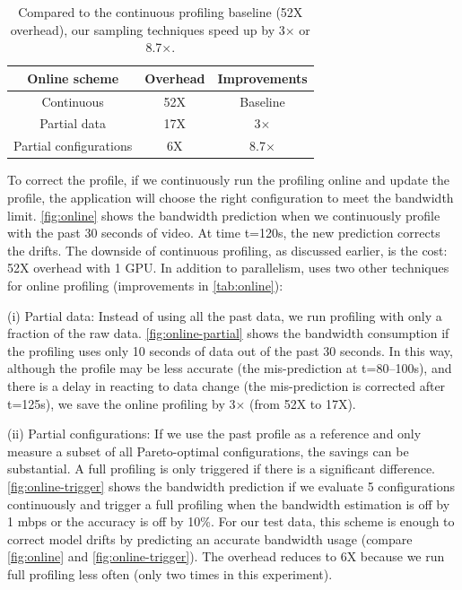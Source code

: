 
\begin{table}[t]
  \footnotesize
  \centering
  \begin{tabular}{c c c}
    \toprule
    Online scheme & Overhead & Improvements \\
    \midrule
    Continuous & 52X & Baseline \\
    Partial data & 17X & 3$\times$\\
    Partial configurations & 6X & 8.7$\times$ \\
    \bottomrule
  \end{tabular}
  \caption{Compared to the continuous profiling baseline (52X overhead), our
    sampling techniques speed up by 3$\times$ or 8.7$\times$.}
  \label{tab:online}
\end{table}

To correct the profile, if we continuously run the profiling online and update
the profile, the application will choose the right configuration to meet the
bandwidth limit.  \autoref{fig:online} shows the bandwidth prediction when we
continuously profile with the past 30 seconds of video. At time t=120s, the new
prediction corrects the drifts. The downside of continuous profiling, as
discussed earlier, is the cost: 52X overhead with 1 GPU\@. In addition to
parallelism, \sysname{} uses two other techniques for online profiling
(improvements in \autoref{tab:online}):

(i) Partial data: Instead of using all the past data, we run profiling with only
a fraction of the raw data.  \autoref{fig:online-partial} shows the bandwidth
consumption if the profiling uses only 10 seconds of data out of the past 30
seconds. In this way, although the profile may be less accurate (the
mis-prediction at t=80--100s), and there is a delay in reacting to data change
(the mis-prediction is corrected after t=125s), we save the online profiling by
3$\times$ (from 52X to 17X).

(ii) Partial configurations: If we use the past profile as a reference and only
measure a subset of all Pareto-optimal configurations, the savings can be
substantial. A full profiling is only triggered if there is a significant
difference. \autoref{fig:online-trigger} shows the bandwidth prediction if we
evaluate 5 configurations continuously and trigger a full profiling when the
bandwidth estimation is off by 1 mbps or the accuracy is off by 10\%.  For our
test data, this scheme is enough to correct model drifts by predicting an
accurate bandwidth usage (compare \autoref{fig:online} and
\autoref{fig:online-trigger}).  The overhead reduces to 6X because we run full
profiling less often (only two times in this experiment).

